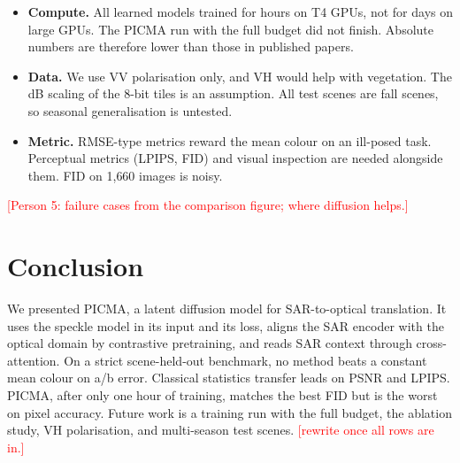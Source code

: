 \documentclass[conference]{IEEEtran}
\newcommand{\pend}[1]{\textcolor{red}{[#1]}}
\begin{document}
\begin{itemize}
\item \textbf{Compute.} All learned models trained for hours on T4 GPUs, not for days on large
  GPUs. The PICMA run with the full budget did not finish. Absolute numbers are therefore lower than those
  in published papers.
\item \textbf{Data.} We use VV polarisation only, and VH would help with vegetation. The dB scaling of the
  8-bit tiles is an assumption. All test scenes are fall scenes, so seasonal generalisation
  is untested.
\item \textbf{Metric.} RMSE-type metrics reward the mean colour on an ill-posed task.
  Perceptual metrics (LPIPS, FID) and visual inspection are needed alongside them. FID on
  1{,}660 images is noisy.
\end{itemize}
\pend{Person 5: failure cases from the comparison figure; where diffusion helps.}

\section{Conclusion}
We presented PICMA, a latent diffusion model for SAR-to-optical translation. It uses the
speckle model in its input and its loss, aligns the SAR encoder with the optical domain by
contrastive pretraining, and reads SAR context through cross-attention. On a strict
scene-held-out benchmark, no method beats a constant mean colour on a/b error. Classical
statistics transfer leads on PSNR and LPIPS. PICMA, after only one hour of training, matches
the best FID but is the worst on pixel accuracy. Future work is a training run with the full
budget, the ablation study, VH polarisation, and multi-season test scenes.
\pend{rewrite once all rows are in.}



\end{document}
